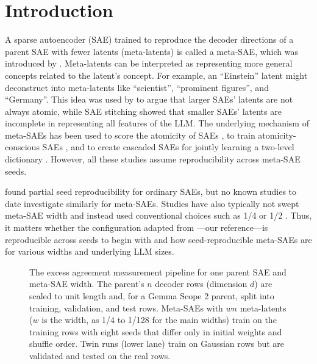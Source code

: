 \section{Introduction}

A sparse autoencoder (SAE) trained to reproduce the decoder directions of a parent SAE with fewer latents (meta-latents) is called a meta-SAE, which was introduced by \citet{bussmann2024metasae}. Meta-latents can be interpreted as representing more general concepts related to the latent's concept. For example, an ``Einstein'' latent might deconstruct into meta-latents like ``scientist'', ``prominent figures'', and ``Germany''. This idea was used by \citet{leask2025canonical} to argue that larger SAEs' latents are not always atomic, while SAE stitching showed that smaller SAEs' latents are incomplete in representing all features of the LLM. The underlying mechanism of meta-SAEs has been used to score the atomicity of SAEs \citep{korznikov2025ortsae}, to train atomicity-conscious SAEs \citep{levinson2026metasaes}, and to create cascaded SAEs for jointly learning a two-level dictionary \citep{zhao2026saepp}. However, all these studies assume reproducibility across meta-SAE seeds.

\citet{paulo2025sae} found partial seed reproducibility for ordinary SAEs, but no known studies to date investigate similarly for meta-SAEs. Studies have also typically not swept meta-SAE width and instead used conventional choices such as 1/4 \citep{bussmann2025matryoshka,korznikov2025ortsae} or 1/2 \citep{zhao2026saepp}. Thus, it matters whether the configuration adapted from \citet{leask2025canonical}---our reference---is reproducible across seeds to begin with and how seed-reproducible meta-SAEs are for various widths and underlying LLM sizes.

\begin{figure}[t]
  \centering
  
  \caption{The excess agreement measurement pipeline for one parent SAE and meta-SAE width. The parent's $n$ decoder rows (dimension $d$) are scaled to unit length and, for a Gemma Scope 2 parent, split into training, validation, and test rows. Meta-SAEs with $wn$ meta-latents ($w$ is the width, as 1/4 to 1/128 for the main widths) train on the training rows with eight seeds that differ only in initial weights and shuffle order. Twin runs (lower lane) train on Gaussian rows but are validated and tested on the real rows.}
  \label{fig:pipeline}
\end{figure}

